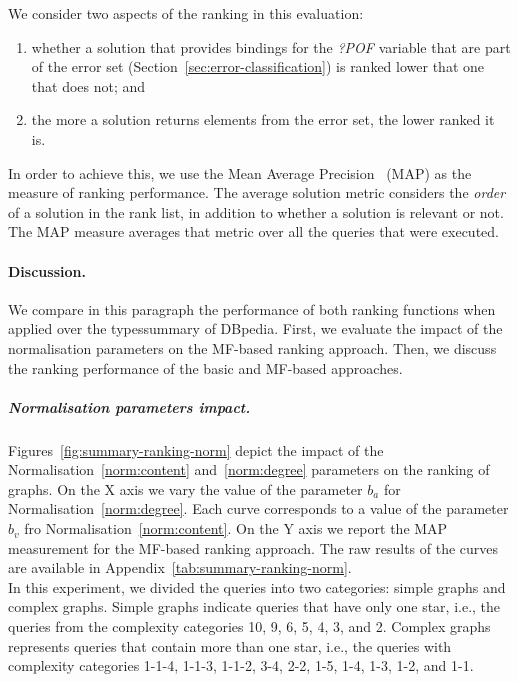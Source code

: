 We consider two aspects of the ranking in this evaluation:
\begin{enumerate}
	\item whether a solution that provides bindings for the \emph{?POF} variable that are part of the error set (Section~\ref{sec:error-classification}) is ranked lower that one that does not; and
	\item the more a solution returns elements from the error set, the lower ranked it is.
\end{enumerate}
In order to achieve this, we use the Mean Average Precision~\cite{manning:2008:iir} (MAP) as the measure of ranking performance.
The average solution metric considers the \emph{order} of a solution in the rank list, in addition to whether a solution is relevant or not.
The MAP measure averages that metric over all the queries that were executed.

\paragraph{Discussion.}

We compare in this paragraph the performance of both ranking functions when applied over the \gls{typessummary} of DBpedia. First, we evaluate the impact of the normalisation parameters on the \gls{MF}-based ranking approach. Then, we discuss the ranking performance of the basic and \gls{MF}-based approaches.

\subparagraph{Normalisation parameters impact.}

Figures~\ref{fig:summary-ranking-norm} depict the impact of the Normalisation~\ref{norm:content} and~\ref{norm:degree} parameters on the ranking of graphs. On the X axis we vary the value of the parameter $b_a$ for Normalisation~\ref{norm:degree}. Each curve corresponds to a value of the parameter $b_v$ fro Normalisation~\ref{norm:content}. On the Y axis we report the MAP measurement for the \gls{MF}-based ranking approach. The raw results of the curves are available in Appendix~\ref{tab:summary-ranking-norm}.\\

In this experiment, we divided the queries into two categories: simple graphs and complex graphs. Simple graphs indicate queries that have only one star, i.e., the queries from the complexity categories 10, 9, 6, 5, 4, 3, and 2. Complex graphs represents queries that contain more than one star, i.e., the queries with complexity categories 1-1-4, 1-1-3, 1-1-2, 3-4, 2-2, 1-5, 1-4, 1-3, 1-2, and 1-1.

